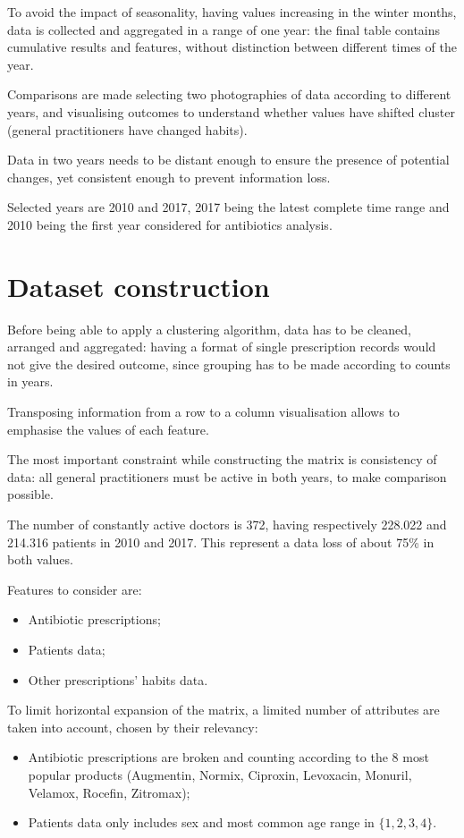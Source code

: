To avoid the impact of seasonality, having values increasing in the winter months, data is collected and aggregated in a range of one year: the final table contains cumulative results and features, without distinction between different times of the year.

Comparisons are made selecting two photographies of data according to different years, and visualising outcomes to understand whether values have shifted cluster (general practitioners have changed habits).

Data in two years needs to be distant enough to ensure the presence of potential changes, yet consistent enough to prevent information loss. 

Selected years are 2010 and 2017, 2017 being the latest complete time range and 2010 being the first year considered for antibiotics analysis.

\section{Dataset construction}
Before being able to apply a clustering algorithm, data has to be cleaned, arranged and aggregated: having a format of single prescription records would not give the desired outcome, since grouping has to be made according to counts in years.

Transposing information from a row to a column visualisation allows to emphasise the values of each feature.

The most important constraint while constructing the matrix is consistency of data: all general practitioners must be active in both years, to make comparison possible.

The number of constantly active doctors is 372, having respectively 228.022 and 214.316 patients in 2010 and 2017. This represent a data loss of about 75\% in both values.

Features to consider are:
\begin{itemize}
	\item Antibiotic prescriptions;
	\item Patients data;
	\item Other prescriptions' habits data.
\end{itemize}

To limit horizontal expansion of the matrix, a limited number of attributes are taken into account, chosen by their relevancy:
\begin{itemize}
	\item Antibiotic prescriptions are broken and counting according to the 8 most popular products (Augmentin, Normix, Ciproxin, Levoxacin, Monuril, Velamox, Rocefin, Zitromax);
	\item Patients data only includes sex and most common age range in $\{1, 2, 3, 4\}$. 
\end{itemize}

